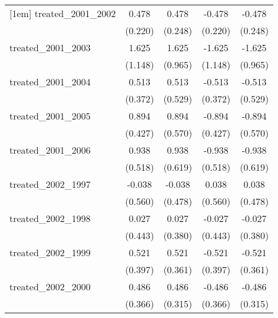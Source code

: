 {\begin{tabular}{l*{4}{c}}
[1em]
treated\_2001\_2002&       0.478\sym{*}  &       0.478         &      -0.478\sym{*}  &      -0.478         \\
            &     (0.220)         &     (0.248)         &     (0.220)         &     (0.248)         \\
[1em]
treated\_2001\_2003&       1.625         &       1.625         &      -1.625         &      -1.625         \\
            &     (1.148)         &     (0.965)         &     (1.148)         &     (0.965)         \\
[1em]
treated\_2001\_2004&       0.513         &       0.513         &      -0.513         &      -0.513         \\
            &     (0.372)         &     (0.529)         &     (0.372)         &     (0.529)         \\
[1em]
treated\_2001\_2005&       0.894\sym{*}  &       0.894         &      -0.894\sym{*}  &      -0.894         \\
            &     (0.427)         &     (0.570)         &     (0.427)         &     (0.570)         \\
[1em]
treated\_2001\_2006&       0.938         &       0.938         &      -0.938         &      -0.938         \\
            &     (0.518)         &     (0.619)         &     (0.518)         &     (0.619)         \\
[1em]
treated\_2002\_1997&      -0.038         &      -0.038         &       0.038         &       0.038         \\
            &     (0.560)         &     (0.478)         &     (0.560)         &     (0.478)         \\
[1em]
treated\_2002\_1998&       0.027         &       0.027         &      -0.027         &      -0.027         \\
            &     (0.443)         &     (0.380)         &     (0.443)         &     (0.380)         \\
[1em]
treated\_2002\_1999&       0.521         &       0.521         &      -0.521         &      -0.521         \\
            &     (0.397)         &     (0.361)         &     (0.397)         &     (0.361)         \\
[1em]
treated\_2002\_2000&       0.486         &       0.486         &      -0.486         &      -0.486         \\
            &     (0.366)         &     (0.315)         &     (0.366)         &     (0.315)         \\

\end{tabular}}
